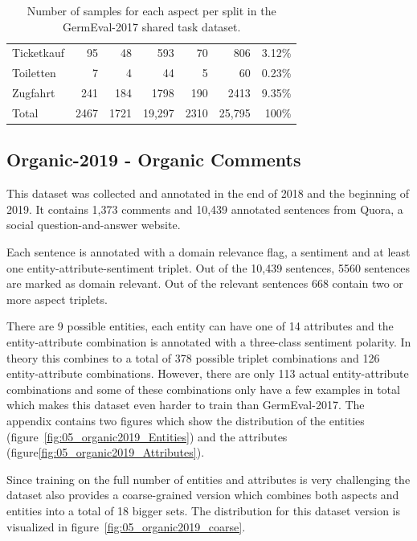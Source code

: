 \begin{table}
\begin{tabular}{lrrrrrr}
		Ticketkauf                   & 95     & 48     & 593    & 70   & 806    & 3.12\%  \\
		Toiletten                    & 7      & 4      & 44     & 5    & 60     & 0.23\%  \\
		Zugfahrt                     & 241    & 184    & 1798   & 190  & 2413   & 9.35\%  \\ 
		\midrule
		Total                        & 2467   & 1721   & 19,297 & 2310 & 25,795 & 100\%   \\ 
		\bottomrule
	\end{tabular}
	\caption{Number of samples for each aspect per split in the GermEval-2017 shared task dataset.}
\label{tab:05_germevalDatasetStats}
\end{table}

\subsection{Organic-2019 - Organic Comments}
\label{sec:05_organic2019}
This dataset was collected and annotated in the end of 2018 and the beginning of 2019. It contains 1,373 comments and 10,439 annotated sentences from Quora, a social question-and-answer website.
\medskip

Each sentence is annotated with a domain relevance flag, a sentiment and at least one entity-attribute-sentiment triplet. Out of the 10,439 sentences, 5560 sentences are marked as domain relevant. Out of the relevant sentences 668 contain two or more aspect triplets.
\medskip

There are 9 possible entities, each entity can have one of 14 attributes and the entity-attribute combination is annotated with a three-class sentiment polarity. In theory this combines to a total of 378 possible triplet combinations and 126 entity-attribute combinations. However, there are only 113 actual entity-attribute combinations and some of these combinations only have a few examples in total which makes this dataset even harder to train than GermEval-2017. The appendix contains two figures which show the distribution of the entities {(figure~\ref{fig:05_organic2019_Entities})} and the attributes {(figure\ref{fig:05_organic2019_Attributes})}.
\medskip

Since training on the full number of entities and attributes is very challenging the dataset also provides a coarse-grained version which combines both aspects and entities into a total of 18 bigger sets. The distribution for this dataset version is visualized in figure~\ref{fig:05_organic2019_coarse}.

